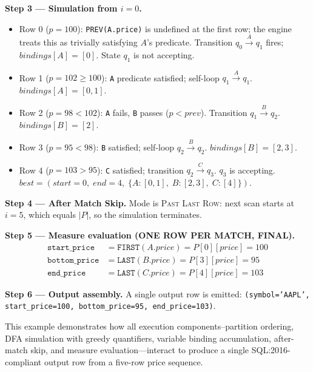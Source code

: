 \vspace{0.5em}
\noindent
\textbf{Step 3 — Simulation from $i=0$.}

\begin{itemize}[leftmargin=2em]
  \item Row 0 ($p=100$): \texttt{PREV(A.price)} is undefined at the
    first row; the engine treats this as trivially satisfying
    $A$'s predicate.  Transition $q_0 \xrightarrow{A} q_1$ fires;
    $\mathit{bindings}[A] = [0]$.  State $q_1$ is not accepting.
  \item Row 1 ($p=102 \geq 100$): \texttt{A} predicate satisfied;
    self-loop $q_1 \xrightarrow{A} q_1$.  $\mathit{bindings}[A] = [0,1]$.
  \item Row 2 ($p=98 < 102$): \texttt{A} fails, \texttt{B} passes
    ($p < \mathit{prev}$).  Transition $q_1 \xrightarrow{B} q_2$.
    $\mathit{bindings}[B] = [2]$.
  \item Row 3 ($p=95 < 98$): \texttt{B} satisfied; self-loop
    $q_2 \xrightarrow{B} q_2$.  $\mathit{bindings}[B] = [2,3]$.
  \item Row 4 ($p=103 > 95$): \texttt{C} satisfied; transition
    $q_2 \xrightarrow{C} q_3$.  $q_3$ is accepting.
    $\mathit{best} = (\mathit{start}{=}0,\; \mathit{end}{=}4,\;
    \{A{:}[0,1],\; B{:}[2,3],\; C{:}[4]\})$.
\end{itemize}

\vspace{0.5em}
\noindent
\textbf{Step 4 — After Match Skip.}
Mode is \textsc{Past Last Row}: next scan starts at $i = 5$, which
equals $|P|$, so the simulation terminates.

\vspace{0.5em}
\noindent
\textbf{Step 5 — Measure evaluation (ONE ROW PER MATCH, FINAL).}
\begin{align*}
  \texttt{start\_price}  &= \texttt{FIRST}(A.\mathit{price})
    = P[0][\mathit{price}] = 100 \\
  \texttt{bottom\_price} &= \texttt{LAST}(B.\mathit{price})
    = P[3][\mathit{price}] = 95 \\
  \texttt{end\_price}    &= \texttt{LAST}(C.\mathit{price})
    = P[4][\mathit{price}] = 103
\end{align*}

\vspace{0.5em}
\noindent
\textbf{Step 6 — Output assembly.}
A single output row is emitted:
\texttt{(symbol='AAPL', start\_price=100, bottom\_price=95,
end\_price=103)}.

This example demonstrates how all execution components--partition
ordering, DFA simulation with greedy quantifiers, variable binding
accumulation, after-match skip, and measure evaluation—interact to
produce a single SQL:2016-compliant output row from a five-row
price sequence.


